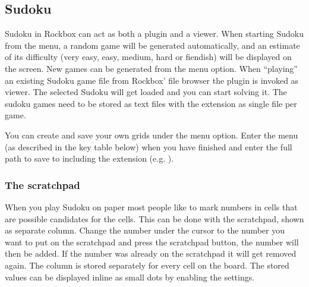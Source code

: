 \subsection{Sudoku}
\label{ref:Sudoku}
Sudoku in Rockbox can act as both a plugin and a viewer.
When starting Sudoku from the  menu, a 
random game will be generated automatically, and an estimate of its difficulty
(very easy, easy, medium, hard or fiendish) will be displayed on the screen.
New games can be generated from the  menu option.
When ``playing'' an existing Sudoku game file from Rockbox' file browser
the plugin is invoked as viewer. The selected Sudoku will get loaded and you
can start solving it. The sudoku games need to be stored as text
files with the extension  as single file per game.

You can create and save your own grids under the  menu option.
Enter the menu (as described in the key table below) when you have finished and
enter the full path to save to including the  extension 
(e.g. ).

\subsubsection{The scratchpad}
When you play Sudoku on paper most people like to mark numbers in cells that 
are possible candidates for the cells.
This can be done with the scratchpad, shown as separate column.
Change the number under the cursor to the number you want to put on the
scratchpad and press the scratchpad button, the number will then be added.
If the number was already on the scratchpad it will get removed again.
The column is stored separately for every cell on the board. The stored values
can be displayed inline as small dots by enabling the 
settings.

